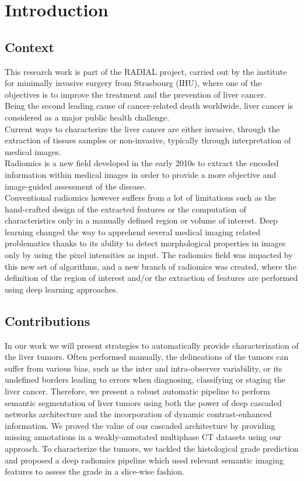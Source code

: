 \chapter{Introduction}

\section{Context}
This research work is part of the RADIAL project, carried out by the
institute for minimally invasive surgery from Strasbourg (IHU), where
one of the objectives is to improve the treatment and the prevention of
liver cancer.\\
Being the second leading cause of cancer-related death worldwide, liver
cancer is considered as a major public health challenge.\\
Current ways to characterize the liver cancer are either invasive, 
through the extraction of tissues samples or non-invasive, typically 
through interpretation of medical images.\\
Radiomics is a new field developed in the early 2010s to extract the encoded information within medical images in order to provide a more objective and image-guided assessment of the disease.\\
Conventional radiomics however suffers from a lot of limitations such as the hand-crafted design of the extracted features or the computation of characteristics only in a manually defined region or volume of interest. Deep learning changed the way to apprehend several medical imaging related problematics thanks to its ability to detect
morphological properties in images only by using the pixel intensities
as input. The radiomics field was impacted by this new set of algorithms, and a new branch of radiomics was created, where the definition of the region of interest and/or the extraction of features are performed using deep learning approaches.

\section{Contributions}
In our work we will present strategies to automatically provide characterization of the liver tumors.
Often performed manually, the delineations of the tumors can suffer from various bias, such as the inter and intra-observer variability, or its undefined borders leading to errors when diagnosing, classifying or staging the liver cancer. Therefore, we present a robust automatic pipeline to perform semantic segmentation of liver tumors using both the power of deep cascaded networks architecture and the incorporation of dynamic contrast-enhanced information. We proved the value of our cascaded architecture by providing missing annotations in a weakly-annotated multiphase CT datasets using our approach.
To characterize the tumors, we tackled the histological grade prediction and proposed a deep radiomics pipeline which used relevant semantic imaging features to assess the grade in a slice-wise fashion.

